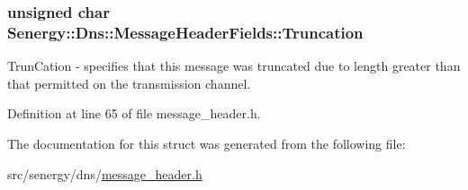 \hypertarget{struct_senergy_1_1_dns_1_1_message_header_fields_a15d1ee99bf788c080001c3216c88274c}{
\subsubsection[{Truncation}]{\setlength{\rightskip}{0pt plus 5cm}unsigned char Senergy\-::\-Dns\-::\-Message\-Header\-Fields\-::\-Truncation}}\label{struct_senergy_1_1_dns_1_1_message_header_fields_a15d1ee99bf788c080001c3216c88274c}


Trun\-Cation -\/ specifies that this message was truncated due to length greater than that permitted on the transmission channel. 



Definition at line 65 of file message\-\_\-header.\-h.



The documentation for this struct was generated from the following file\-:\begin{DoxyCompactItemize}
\item 
src/senergy/dns/\hyperlink{message__header_8h}{message\-\_\-header.\-h}\end{DoxyCompactItemize}
